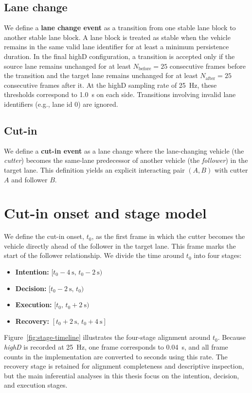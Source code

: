 \documentclass[12pt,a4paper,twoside,openright]{report}
\begin{document}
    \subsection{Lane change}
    We define a \textbf{lane change event} as a transition from one stable lane block to another stable lane block. A lane block is treated as stable when the vehicle remains in the same valid lane identifier for at least a minimum persistence duration. In the final highD configuration, a transition is accepted only if the source lane remains unchanged for at least $N_\text{before}=25$ consecutive frames before the transition and the target lane remains unchanged for at least $N_\text{after}=25$ consecutive frames after it. At the highD sampling rate of \SI{25}{\hertz}, these thresholds correspond to \SI{1.0}{\second} on each side. Transitions involving invalid lane identifiers (e.g., lane id 0) are ignored.

    \subsection{Cut-in}
    We define a \textbf{cut-in event} as a lane change where the lane-changing vehicle (the \emph{cutter}) becomes the same-lane predecessor of another vehicle (the \emph{follower}) in the target lane. This definition yields an explicit interacting pair $(A,B)$ with cutter $A$ and follower $B$.

    \section{Cut-in onset and stage model}
    We define the cut-in onset, $t_0$, as the first frame in which the cutter becomes the vehicle directly ahead of the follower in the target lane. This frame marks the start of the follower relationship. We divide the time around $t_0$ into four stages:
    \begin{itemize}[leftmargin=1.2em]
  \item \textbf{Intention:} $[t_0-\SI{4}{\second},\, t_0-\SI{2}{\second})$
  \item \textbf{Decision:} $[t_0-\SI{2}{\second},\, t_0)$
  \item \textbf{Execution:} $[t_0,\, t_0+\SI{2}{\second})$
  \item \textbf{Recovery:} $[t_0+\SI{2}{\second},\, t_0+\SI{4}{\second}]$
    \end{itemize}

    Figure~\ref{fig:stage-timeline} illustrates the four-stage alignment around $t_0$. Because \textit{highD} is recorded at \SI{25}{\hertz}, one frame corresponds to \SI{0.04}{\second}, and all frame counts in the implementation are converted to seconds using this rate. The recovery stage is retained for alignment completeness and descriptive inspection, but the main inferential analyses in this thesis focus on the intention, decision, and execution stages.
\end{document}
